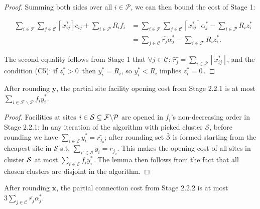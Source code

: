 \documentclass[10pt]{llncs}
\begin{document}
\begin{proof}
Summing both sides over all $i\in\mathcal{P}$, we can then bound
the cost of Stage 1:

$ $
\begin{eqnarray*}
 & \sum_{i\in\mathcal{P}}\sum_{j\in\mathcal{C}}\left\lceil x_{ij}^{*}\right\rceil c_{ij}+\sum_{i\in\mathcal{P}}R_{i}f_{i} & =\sum_{i\in\mathcal{P}}\sum_{j\in\mathcal{C}}\left\lceil x_{ij}^{*}\right\rceil \alpha_{j}^{*}-\sum_{i\in\mathcal{P}}R_{i}z_{i}^{*}\\
 &  & =\sum_{j\in\mathcal{C}}\hat{r_{j}}\alpha_{j}^{*}-\sum_{i\in\mathcal{F}}R_{i}z_{i}^{*}.
\end{eqnarray*}


The second equality follows from Stage 1 that $\forall j\in\mathcal{C}:\,\hat{r_{j}}=\sum_{i\in\mathcal{P}}\left\lceil x_{ij}^{*}\right\rceil $,
and the condition (C5): if $z_{i}^{*}>0\,$ then $y_{i}^{*}=R_{i}$,
so $y_{i}^{*}<R_{i}$ implies $z_{i}^{*}=0\,$.\end{proof}
\begin{lemma}
After rounding $\boldsymbol{y}$, the partial site facility opening
cost from Stage 2.2.1 is at most $\sum_{i\in\mathcal{F}\backslash\mathcal{P}}f_{i}y_{i}^{*}$.
\label{lem: boc}\end{lemma}
\begin{proof}
Facilities at sites $i\in{\cal S}\subseteq\mathcal{F}\backslash\mathcal{P}$
are opened in $f_{i}$'s non-decreasing order in Stage 2.2.1: In any
iteration of the algorithm with picked cluster $\mathcal{S}$, before
rounding we have $\sum_{i\in\mathcal{S}}y_{i}^{*}=\bar{r_{j_{o}}}$;
after rounding set $\bar{\mathcal{S}}$ is formed starting from the
cheapest site in $\mathcal{S}$ s.t. $\sum_{i'\in\bar{\mathcal{S}}}y_{i}=\bar{r_{j_{o}}}$.
This makes the opening cost of all sites in cluster $\bar{{\cal S}}$
at most $\sum_{i\in\mathcal{S}}f_{i}y_{i}^{*}$. The lemma then follows
from the fact that all chosen clusters are disjoint in the algorithm.\end{proof}
\begin{lemma}
After rounding $\boldsymbol{x}$, the partial connection cost from
Stage 2.2.2 is at most $3\sum_{j\in\mathcal{C}}\bar{r_{j}}\alpha_{j}^{*}$.
\label{lem: conn} \end{lemma}
\end{document}
